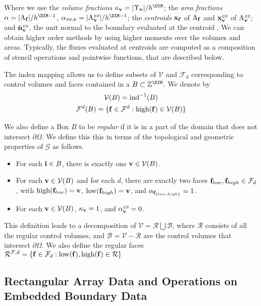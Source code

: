 \documentclass[12pt]{article}
\newcommand{\mcl}[1]{{\mathcal{#1}}}
\newcommand{\ind}{{\rm{ind}}}
\newcommand{\low}{{\rm{low}}}
\newcommand{\high}{{\rm{high}}}
\newcommand{\vol}[1]{{\Upsilon_{#1}}}
\newcommand{\area}[1]{{\rm{A}_{#1}}}
\newcommand{\vof}{{\mbf{v}}}
\newcommand{\face}{{\mbf{f}}}
\newcommand{\ebsub}{{\text{\it \tiny EB}}}
\newcommand{\areaEB}[1]{{{\rm A}_{#1}^{\ebsub}}}
\begin{document}
Where we use the {\it volume fractions} $\kappa_\vof = |\vol{\vof} |/h^\DIM$; the {\it area fractions} $\alpha = | \area{\face} | / h^{\DIM-1}$, $\alpha_{\ebsub,\vof} = |\areaEB{\vof} | /  h^{\DIM-1}$; the {\it centroids} $\mbf{x}_\face$ of $\area{\face}$ and $\mbf{x}_{\vof}^\ebsub$ of $\areaEB{\vof}$; and $\hat{\mbf{n}}_{\vof}^\ebsub$, the unit normal to the boundary evaluated at the centroid . We can obtain higher order methods by using higher moments over the volumes and areas. Typically, the fluxes evaluated at centroids are computed as a composition of stencil operations and pointwise functions, that are described below.

The index mapping allows us to define subsets of $\mcl{V}$ and $\mcl{F}_d$ corresponding to control volumes and faces contained in a  $B \subset \mbb{Z}^\DIM$. We denote by 
\begin{gather*}
\mcl{V}(B) = \ind^{-1} (B) \\
\mcl{F}^d (B) = \{\face \in \mcl{F}^d: \high (\face ) \in \mcl{V}(B) \}
\end{gather*}

We also define a Box $B$ to be {\it regular} if it is in a part of the domain that does not intersect $\partial \Omega$. We define this this in terms of the topological and geometric properties of $\mcl{G}$ as follows.
\begin{itemize}
\item
For each $\mathbf{i} \in B$, there is exactly one $\vof \in \mcl{V}(B)$.
\item
For each $\vof \in \mcl{V}(B)$ and for each $d$, there are exactly two faces 
$\face_{low}, \face_{high} \in \mcl{F}_d$, with $\high(\face_{low}) = \vof$, $\low(\face_{high}) = \vof$, and $\alpha_{\face_{\{low,high\} }} = 1$.
\item
For each $\vof \in \mcl{V}(B)$, $\kappa_\vof = 1$, and $\alpha^\ebsub_\vof = 0$.
\end{itemize}

This definition leads to a decomposition of $\mcl{V} = \mcl{R} \bigcup \mcl{B}$, where $\mcl{R}$ consists of all the regular control volumes, and $\mcl{B} = \mcl{V} - \mcl{R}$ are the control volumes that intersect $\partial \Omega$. We also define the regular faces  $\mcl{R}^{\mcl{F},d} = \{\face \in \mcl{F}_d : \low(\face),\high(\face) \in \mcl{R}\}$

\subsection{Rectangular Array Data and Operations on Embedded Boundary Data}
\end{document}
